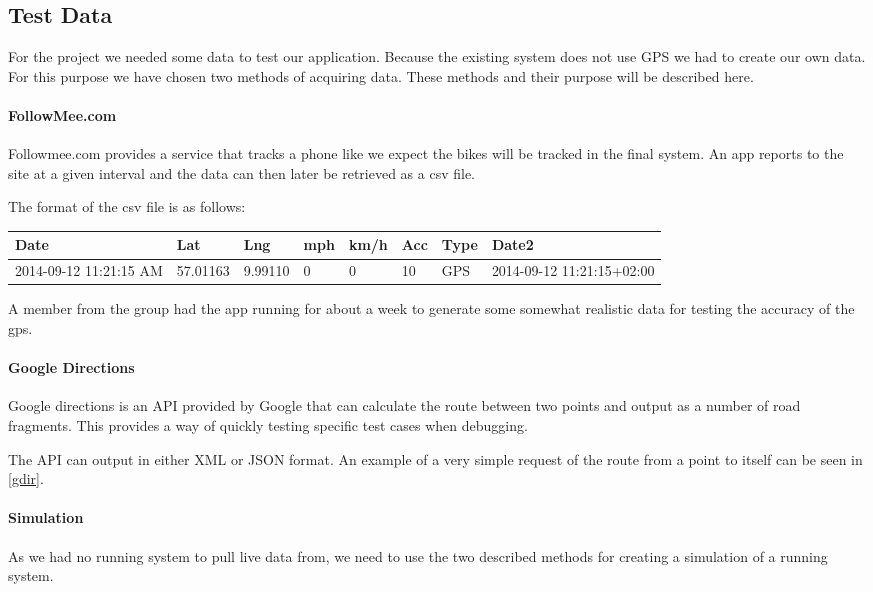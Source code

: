 \subsection{Test Data}

For the project we needed some data to test our application.
Because the existing system does not use GPS we had to create our own data.
For this purpose we have chosen two methods of acquiring data.
These methods and their purpose will be described here.

\paragraph{FollowMee.com}
Followmee.com provides a service that tracks a phone like we expect the bikes will be tracked in the final system.
An app reports to the site at a given interval and the data can then later be retrieved as a csv file.

The format of the csv file is as follows:

\noindent
\begin{tabular}{| l l l l l l l l |}
\hline
Date & Lat & Lng & mph & km/h & Acc & Type & Date2\\
\hline
2014-09-12 11:21:15 AM&57.01163&9.99110&0&0&10&GPS&2014-09-12 11:21:15+02:00\\
\hline
\end{tabular}

A member from the group had the app running for about a week to generate some somewhat realistic data for testing the accuracy of the gps.

\paragraph{Google Directions}
Google directions is an API provided by Google that can calculate the route between two points and output as a number of road fragments.
This provides a way of quickly testing specific test cases when debugging.

The API can output in either XML or JSON format.
An example of a very simple request of the route from a point to itself can be seen in \cref{gdir}.

\paragraph{Simulation}
As we had no running system to pull live data from, we need to use the two described methods for creating a simulation of a running system.
